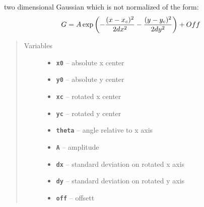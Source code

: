 \documentclass[letterpaper,10pt,english]{sphinxmanual}
\begin{document}
\begin{fulllineitems}

\begin{fulllineitems}
\label{fit_object:Fitobject.fit_object.gauss_2D}
two dimensional Gaussian which is not normalized of the form:
\begin{gather}
\begin{split}G = A \exp\left(-\frac{(x-x_c)^2}{2dx^2}- \frac{(y-y_c)^2}{2dy^2}\right)+ Off\end{split}\notag
\end{gather}\begin{quote}\begin{description}
\item[{Variables}] \leavevmode\begin{itemize}
\item {} 
\textbf{\texttt{x0}} -- absolute x center

\item {} 
\textbf{\texttt{y0}} -- absolute y center

\item {} 
\textbf{\texttt{xc}} -- rotated x center

\item {} 
\textbf{\texttt{yc}} -- rotated y center

\item {} 
\textbf{\texttt{theta}} -- angle relative to x axis

\item {} 
\textbf{\texttt{A}} -- amplitude

\item {} 
\textbf{\texttt{dx}} -- standard deviation on rotated x axis

\item {} 
\textbf{\texttt{dy}} -- standard deviation on rotated y axis

\item {} 
\textbf{\texttt{off}} -- offsett

\end{itemize}

\end{description}\end{quote}

\end{fulllineitems}



\end{fulllineitems}
\end{document}
